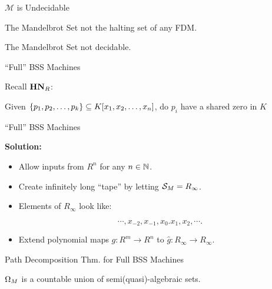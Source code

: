 \documentclass[c]{beamer}
\begin{document}
\begin{frame}{$\mathcal{M}$ is Undecidable}
  
  \begin{corollary}
    The Mandelbrot Set not the halting set of any FDM.
  \end{corollary}

  \begin{corollary}
    The Mandelbrot Set not decidable.
  \end{corollary}
  
\end{frame}

\begin{frame}{``Full'' BSS Machines}
  
  Recall $\mathbf{HN}_R$:\\

  \vspace{\baselineskip}

  Given $\{p_1, p_2, \ldots, p_k\} \subseteq K[x_1, x_2,\ldots,x_n]$, do $p_i$
  have a shared zero in $K$\\
  
  \vspace{\baselineskip}

\end{frame}

\begin{frame}{``Full'' BSS Machines}

  \textbf{Solution:}

  \begin{itemize}
  \item Allow inputs from $R^n$ for any $n \in \mathbb{N}$.
  \item Create infinitely long ``tape'' by letting $\mathcal{S}_M =
    R_\infty$.\pause
  \item Elements of $R_\infty$ look like:

    \vspace{-.8\baselineskip}

    $$\cdots, x_{-2}, x_{-1}, x_0 . x_1, x_2, \cdots.$$\pause

    \vspace{-\baselineskip}

  \item Extend polynomial maps $g: R^m \rightarrow R^n$ to $\hat{g}:
    R_\infty \rightarrow R_\infty$.
\end{itemize}
\end{frame}

\begin{frame}{Path Decomposition Thm. for Full BSS Machines}

  \begin{theorem}
    $\Omega_M$ is a countable union of semi(quasi)-algebraic sets.
  \end{theorem}
  
\end{frame}
\end{document}
